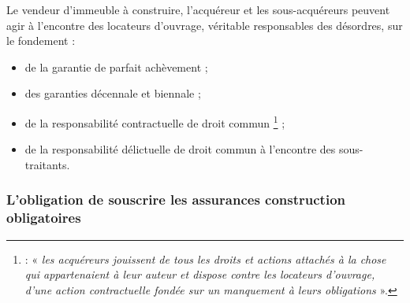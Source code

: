 					Le vendeur d’immeuble à construire, l’acquéreur et les sous-acquéreurs peuvent agir à l’encontre des locateurs d’ouvrage, véritable responsables des désordres, sur le fondement :
					\begin{itemize}
						\item de la garantie de parfait achèvement ;
						\item des garanties décennale et biennale
;
						\item de la responsabilité contractuelle de droit commun \footnote{ : « {\itshape les acquéreurs jouissent de tous les droits et actions attachés à la chose qui appartenaient à leur auteur et dispose contre les locateurs d’ouvrage, d’une action contractuelle fondée sur un manquement à leurs obligations} ».} ;
						\item de la responsabilité délictuelle de droit commun à l’encontre des sous-traitants.
					\end{itemize}


			\subsubsection{L'obligation de souscrire les assurances construction obligatoires}

